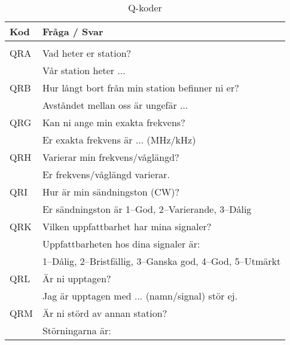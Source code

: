 \begin{longtable}{ll}
	\textbf{Kod} & \textbf{Fråga / Svar}                                                \\ \hline
	\endhead
	\caption{Q-koder}                                                                   \\
\endlastfoot
	QRA          & Vad heter er station?                                                \\
                     & Vår station heter ...                                                \\ \hline
	QRB          & Hur långt bort från min station befinner ni er?                      \\
                     & Avståndet mellan oss är ungefär ...                                  \\ \hline
	QRG          & Kan ni ange min exakta frekvens?                                     \\
                     & Er exakta frekvens är ... (MHz/kHz)                                  \\ \hline
	QRH          & Varierar min frekvens/våglängd?                                      \\
                     & Er frekvens/våglängd varierar.                                       \\ \hline
	QRI          & Hur är min sändningston (CW)?                                        \\
                     & Er sändningston är 1--God, 2--Varierande, 3--Dålig                   \\ \hline
	QRK          & Vilken uppfattbarhet har mina signaler?                              \\
                     & Uppfattbarheten hos dina signaler är:                                \\
                     & 1--Dålig, 2--Bristfällig, 3--Ganska god, 4--God, 5--Utmärkt          \\ \hline
	QRL          & Är ni upptagen?                                                      \\
                     & Jag är upptagen med ... (namn/signal) stör ej.                       \\ \hline
	QRM          & Är ni störd av annan station?                                        \\
                     & Störningarna är:                                                     \\

\end{longtable}
